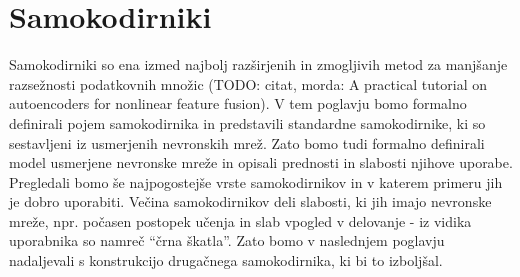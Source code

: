 \documentclass[12pt,a4paper,twoside]{article}
\theoremstyle{definition} %
\theoremstyle{plain} %
\numberwithin{equation}{section}  %
\begin{document}


\section{Samokodirniki}

Samokodirniki so ena izmed najbolj razširjenih in zmogljivih metod za manjšanje razsežnosti podatkovnih množic (TODO: citat, morda: A practical tutorial on autoencoders for nonlinear feature fusion). 
V tem poglavju bomo formalno definirali pojem samokodirnika in predstavili standardne samokodirnike, ki so sestavljeni iz usmerjenih nevronskih mrež. 
Zato bomo tudi formalno definirali model usmerjene nevronske mreže in opisali prednosti in slabosti njihove uporabe.
Pregledali bomo še najpogostejše vrste samokodirnikov in v katerem primeru jih je dobro uporabiti.
Večina samokodirnikov deli slabosti, ki jih imajo nevronske mreže, npr. počasen postopek učenja in slab vpogled v delovanje - iz vidika uporabnika so namreč ``črna škatla''.
Zato bomo v naslednjem poglavju nadaljevali s konstrukcijo drugačnega samokodirnika, ki bi to izboljšal.


\end{document}
